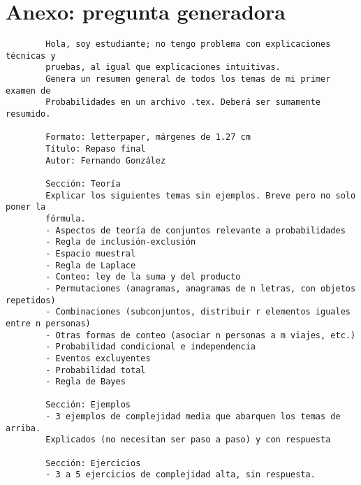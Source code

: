 \documentclass[letterpaper, 12pt]{article}
\begin{document}
	\newpage
	\section*{Anexo: pregunta generadora}
	\begin{verbatim}
		Hola, soy estudiante; no tengo problema con explicaciones técnicas y
		pruebas, al igual que explicaciones intuitivas.
		Genera un resumen general de todos los temas de mi primer examen de
		Probabilidades en un archivo .tex. Deberá ser sumamente resumido.
		
		Formato: letterpaper, márgenes de 1.27 cm
		Título: Repaso final
		Autor: Fernando González
		
		Sección: Teoría
		Explicar los siguientes temas sin ejemplos. Breve pero no solo poner la
		fórmula.
		- Aspectos de teoría de conjuntos relevante a probabilidades
		- Regla de inclusión-exclusión
		- Espacio muestral
		- Regla de Laplace
		- Conteo: ley de la suma y del producto
		- Permutaciones (anagramas, anagramas de n letras, con objetos repetidos)
		- Combinaciones (subconjuntos, distribuir r elementos iguales entre n personas)
		- Otras formas de conteo (asociar n personas a m viajes, etc.)
		- Probabilidad condicional e independencia
		- Eventos excluyentes
		- Probabilidad total
		- Regla de Bayes
		
		Sección: Ejemplos
		- 3 ejemplos de complejidad media que abarquen los temas de arriba.
		Explicados (no necesitan ser paso a paso) y con respuesta
		
		Sección: Ejercicios
		- 3 a 5 ejercicios de complejidad alta, sin respuesta.
	\end{verbatim}
\end{document}
